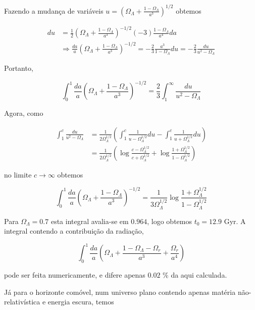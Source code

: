 \documentclass[a4paper, 12pt, notitlepage]{article}
\begin{document}
\begin{enumerate}
Fazendo a mudança de variáveis $u = \left(\Omega_\Lambda + \frac{1 - \Omega_\Lambda}{a^3}\right)^{1/2}$ obtemos

\begin{align*}
  du &= \frac{1}{2}\left(\Omega_\Lambda + \frac{1 - \Omega_\Lambda}{a^3}\right)^{-1/2}(-3)\frac{1 - \Omega_\Lambda}{a^4} da  \nonumber \\ 
  &\Rightarrow \frac{da}{a}\left(\Omega_\Lambda + \frac{1 - \Omega_\Lambda}{a^3}\right)^{-1/2} = -\frac{2}{3} \frac{a^3}{1 - \Omega_\Lambda}du = -\frac{2}{3} \frac{du}{u^2 - \Omega_\Lambda} \nonumber
\end{align*}

Portanto,

\begin{equation*}
  \int_0^1 \frac{da}{a} \left(\Omega_\Lambda + \frac{1 - \Omega_\Lambda}{a^3}\right)^{-1/2} = \frac{2}{3} \int_1^{\infty} \frac{du}{u^2 - \Omega_\Lambda}
\end{equation*}

Agora, como

\begin{align*}
  \int_1^c \frac{du}{u^2 - \Omega_\Lambda} &= \frac{1}{2\Omega_\Lambda^{1/2}} \left( \int_1^c \frac{1}{u - \Omega_\Lambda^{1/2}} du - \int_1^c \frac{1}{u + \Omega_\Lambda^{1/2}} du\right) \\
  &= \frac{1}{2\Omega_\Lambda^{1/2}}\left( \log \frac{c - \Omega_\Lambda^{1/2}}{c + \Omega_\Lambda^{1/2}} + \log\frac{1 + \Omega_\Lambda^{1/2}}{1 - \Omega_\Lambda^{1/2}}\right)
\end{align*}

\noindent no limite $c \to \infty$ obtemos

\begin{equation*}
  \int_0^1 \frac{da}{a} \left(\Omega_\Lambda + \frac{1 - \Omega_\Lambda}{a^3}\right)^{-1/2} = \frac{1}{3\Omega_\Lambda^{1/2}} \log \frac{1 + \Omega_\Lambda^{1/2}}{1 - \Omega_\Lambda^{1/2}}
\end{equation*}

Para $\Omega_\Lambda = 0.7$ esta integral avalia-se em $0.964$, logo obtemos $t_0 = 12.9$ Gyr. A integral contendo a contribuição da radiação,

$$ \int_0^1 \frac{da}{a} \left(\Omega_\Lambda + \frac{1 - \Omega_\Lambda - \Omega_r}{a^3} + \frac{\Omega_r}{a^4}\right) $$

\noindent pode ser feita numericamente, e difere apenas $0.02$ \% da aqui calculada.

Já para o horizonte comóvel, num universo plano contendo apenas matéria não-relativística e energia escura, temos


\end{enumerate}
\end{document}
